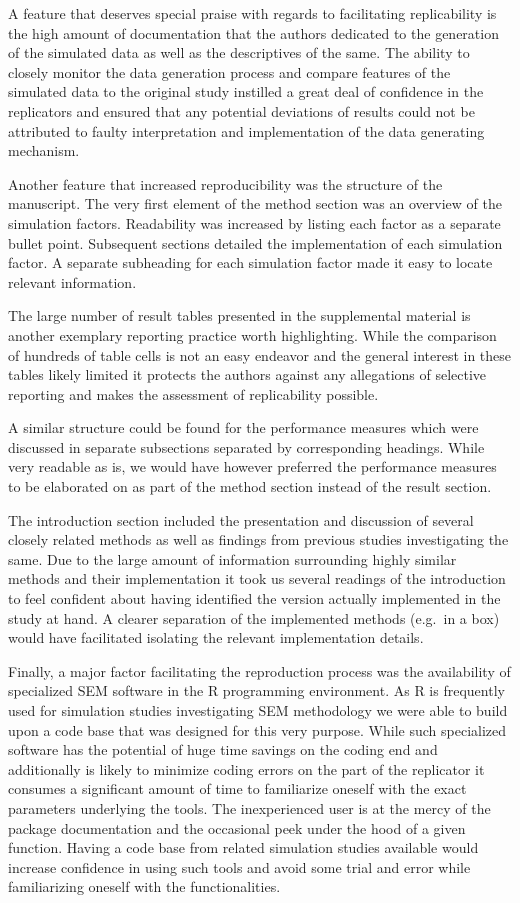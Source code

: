 \documentclass[10,a4paperpaper,]{article}
\begin{document}
A feature that deserves special praise with regards to facilitating
replicability is the high amount of documentation that the authors
dedicated to the generation of the simulated data as well as the
descriptives of the same. The ability to closely monitor the data
generation process and compare features of the simulated data to the
original study instilled a great deal of confidence in the replicators
and ensured that any potential deviations of results could not be
attributed to faulty interpretation and implementation of the data
generating mechanism.

Another feature that increased reproducibility was the structure of the
manuscript. The very first element of the method section was an overview
of the simulation factors. Readability was increased by listing each
factor as a separate bullet point. Subsequent sections detailed the
implementation of each simulation factor. A separate subheading for each
simulation factor made it easy to locate relevant information.

The large number of result tables presented in the supplemental material
is another exemplary reporting practice worth highlighting. While the
comparison of hundreds of table cells is not an easy endeavor and the
general interest in these tables likely limited it protects the authors
against any allegations of selective reporting and makes the assessment
of replicability possible.

A similar structure could be found for the performance measures which
were discussed in separate subsections separated by corresponding
headings. While very readable as is, we would have however preferred the
performance measures to be elaborated on as part of the method section
instead of the result section.

The introduction section included the presentation and discussion of
several closely related methods as well as findings from previous
studies investigating the same. Due to the large amount of information
surrounding highly similar methods and their implementation it took us
several readings of the introduction to feel confident about having
identified the version actually implemented in the study at hand. A
clearer separation of the implemented methods (e.g.~in a box) would have
facilitated isolating the relevant implementation details.

Finally, a major factor facilitating the reproduction process was the
availability of specialized SEM software in the R programming
environment. As R is frequently used for simulation studies
investigating SEM methodology we were able to build upon a code base
that was designed for this very purpose. While such specialized software
has the potential of huge time savings on the coding end and
additionally is likely to minimize coding errors on the part of the
replicator it consumes a significant amount of time to familiarize
oneself with the exact parameters underlying the tools. The
inexperienced user is at the mercy of the package documentation and the
occasional peek under the hood of a given function. Having a code base
from related simulation studies available would increase confidence in
using such tools and avoid some trial and error while familiarizing
oneself with the functionalities.
\end{document}
